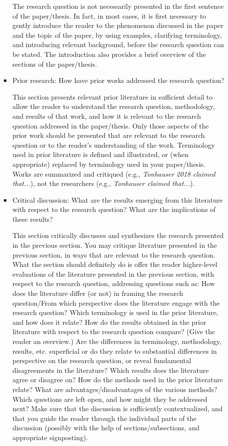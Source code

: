 \documentclass[11pt,fleqn,a4paper/thesis]{article}
\newcommand{\6}{\mbox{$[\hspace*{-.6mm}[$}}
\newcommand{\9}{\mbox{$]\hspace*{-.6mm}]$}}
\begin{document}
\begin{itemize}[itemsep=-1pt,leftmargin=2.5ex,topsep=-2pt]
\begin{enumerate}
\begin{itemize}[leftmargin=2.5ex,topsep=-2pt]
The research question is not necessarily presented in the first sentence of the paper/thesis. In fact, in most cases, it is first necessary to gently introduce the reader to the phenomenon discussed in the paper and the topic of the paper, by using examples, clarifying terminology, and introducing relevant background, before the research question can be stated. The introduction also provides a brief overview of the sections of the paper/thesis.

\item Prior research: How have prior works addressed the research question? 

This section presents relevant prior literature in sufficient detail to allow the reader to understand the research question, methodology, and results of that work, and how it is relevant to the research question addressed in the paper/thesis. Only those aspects of the prior work should be presented that are relevant to the research question or to the reader's understanding of the work. Terminology used in prior literature is defined and illustrated, or (when appropriate) replaced by terminology used in your paper/thesis. Works are summarized and critiqued (e.g., {\em Tonhauser 2018 claimed that...}), not the researchers (e.g., {\em Tonhauser claimed that...}). 

\item Critical discussion: What are the results emerging from this literature with respect to the research question? What are the implications of these results?

This section critically discusses and synthesizes the research presented in the previous section. You may critique literature presented in the previous section, in ways that are relevant to the research question. What the section should definitely do is offer the reader higher-level evaluations of the literature presented in the previous section, with respect to the research question, addressing questions such as: How does the literature differ (or not) in framing the research question/From which perspective does the literature engage with the research question? Which terminology is used in the prior literature, and how does it relate? How do the results obtained in the prior literature with respect to the research question compare? (Give the reader an overview.) Are the differences in terminology, methodology, results, etc. superficial or do they relate to substantial differences in perspective on the research question, or reveal fundamental disagreements in the literature? Which results does the literature agree or disagree on? How do the methods used in the prior literature relate? What are advantages/disadvantages of the various methods? Which questions are left open, and how might they be addressed next? Make sure that the discussion is sufficiently contextualized, and that you guide the reader through the individual parts of the discussion (possibly with the help of sections/subsections, and appropriate signposting).


\end{itemize}
\end{enumerate}
\end{itemize}
\end{document}
